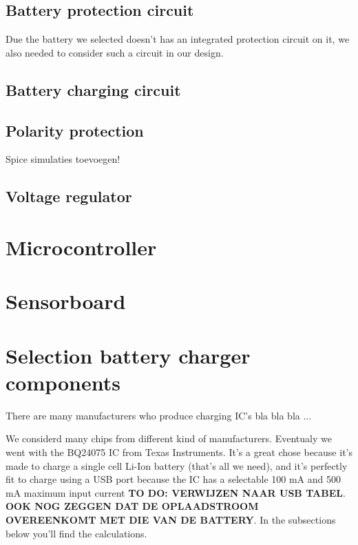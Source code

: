 \documentclass[11pt,a4paper]{article}
\begin{document}
\subsection{Battery protection circuit}
Due the battery we selected doesn't has an integrated protection circuit on it, we also needed to consider such a circuit in our design.

\subsection{Battery charging circuit}

\subsection{Polarity protection}
Spice simulaties toevoegen!

\subsection{Voltage regulator}

\section{Microcontroller}

\section{Sensorboard}



\section{Selection battery charger components}
There are many manufacturers who produce charging IC's  bla bla bla ...

We considerd many chips from different kind of manufacturers. Eventualy we went with the BQ24075 IC from Texas Instruments. It's a great chose because it's made to charge a single cell Li-Ion battery (that's all we need), and it's perfectly fit to charge using a USB port because the IC has a selectable 100 mA and 500 mA maximum input current \textbf{TO DO: VERWIJZEN NAAR USB TABEL}. \textbf{OOK NOG ZEGGEN DAT DE OPLAADSTROOM OVEREENKOMT MET DIE VAN DE BATTERY}. In the subsections below you'll find the calculations.
\end{document}
